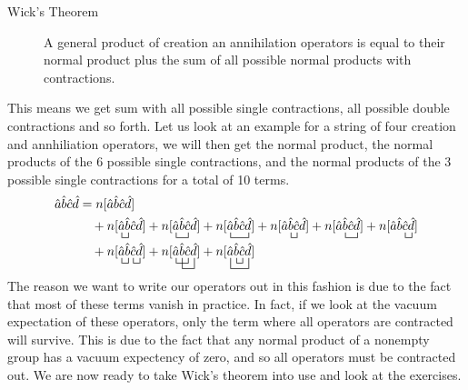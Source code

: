 \documentclass[a4paper, 11pt, notitlepage, english]{article}
\newcommand{\op}[1]{\hat{#1}}
\begin{document}
\begin{description}
 	\item[\qquad Wick's Theorem] $ $\\
 	A general product of creation an annihilation operators is equal to their normal product plus the sum of all possible normal products with contractions.
\end{description}
This means we get sum with all possible single contractions, all possible double contractions and so forth. Let us look at an example for a string of four creation and annhiliation operators, we will then get the normal product, the normal products of the 6 possible single contractions, and the normal products of the 3 possible single contractions for a total of 10 terms.
\begin{align*}
\op{a}\op{b}\op{c}\op{d} &= n[\op{a}\op{b}\op{c}\op{d}] \\
&\quad + n[\bcontraction{}{a}{}{b}\op{a}\op{b}\op{c}\op{d}] 
+ n[\bcontraction{}{a}{b}{c}\op{a}\op{b}\op{c}\op{d}] 
+ n[\bcontraction{}{a}{bc}{d}\op{a}\op{b}\op{c}\op{d}] 
+ n[\bcontraction{a}{b}{}{c}\op{a}\op{b}\op{c}\op{d}] 
+ n[\bcontraction{a}{b}{c}{d}\op{a}\op{b}\op{c}\op{d}] + n[\bcontraction{ab}{c}{}{d}\op{a}\op{b}\op{c}\op{d}] \\
&\quad + n[\bcontraction[1ex]{}{a}{}{b}\bcontraction[1ex]{ab}{c}{}{d}\op{a}\op{b}\op{c}\op{d}] + n[\bcontraction[1ex]{}{a}{b}{c}\bcontraction[2ex]{a}{b}{c}{d}\op{a}\op{b}\op{c}\op{d}] + n[\bcontraction[2ex]{}{a}{bc}{d}\bcontraction[1ex]{a}{b}{}{c}\op{a}\op{b}\op{c}\op{d}]
\end{align*}
The reason we want to write our operators out in this fashion is due to the fact that most of these terms vanish in practice. In fact, if we look at the vacuum expectation of these operators, only the term where all operators are contracted will survive. This is due to the fact that any normal product of a nonempty group has a vacuum expectency of zero, and so all operators must be contracted out. We are now ready to take Wick's theorem into use and look at the exercises.
\end{document}
